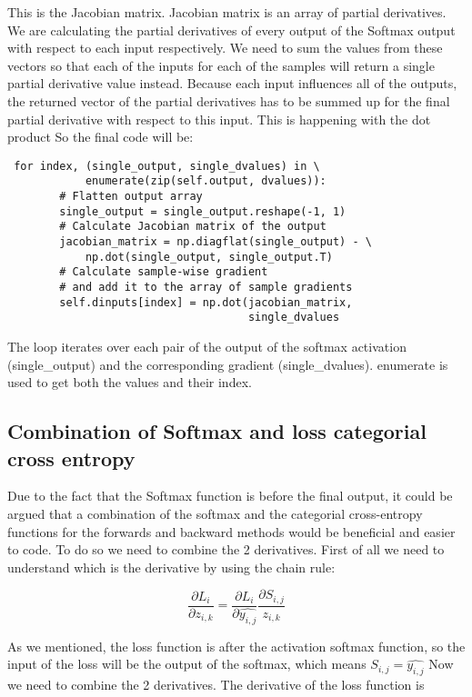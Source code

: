 \documentclass{article}
\begin{document}
This is the Jacobian matrix. Jacobian matrix is an array of partial derivatives. We are calculating the partial derivatives of every output of the Softmax output with respect to each input respectively. We need to sum the values from these vectors so that each of the inputs for each of the samples will return a single partial derivative value instead. Because each input influences all of the outputs, the returned vector of the partial derivatives has to be summed up for the final partial derivative with respect to this input. This is happening with the dot product
So the final code will be: 
\begin{lstlisting}
 for index, (single_output, single_dvalues) in \
            enumerate(zip(self.output, dvalues)):
        # Flatten output array
        single_output = single_output.reshape(-1, 1)
        # Calculate Jacobian matrix of the output
        jacobian_matrix = np.diagflat(single_output) - \
            np.dot(single_output, single_output.T)
        # Calculate sample-wise gradient
        # and add it to the array of sample gradients
        self.dinputs[index] = np.dot(jacobian_matrix,
                                     single_dvalues
\end{lstlisting}
The loop iterates over each pair of the output of the softmax activation (single\_output) and the corresponding gradient (single\_dvalues). enumerate is used to get both the values and their index.
\subsection{Combination of Softmax and loss categorial cross entropy}
Due to the fact that the Softmax function is before the final output, it could be argued that a combination of the softmax and the categorial cross-entropy functions for the forwards and backward methods would be beneficial and easier to code. To do so we need to combine the 2 derivatives.  
First of all we need to understand which is the derivative by using the chain rule: 

 \begin{equation}
     \frac{\partial L_i}{\partial z_{i,k}} = \frac{\partial L_i}{\partial \hat{y_{i,j}}} \frac{\partial S_{i,j}}{z_{i,k}} \end{equation}

As we mentioned, the loss function is after the activation softmax function, so the input of the loss will be the output of the softmax, which means $ S_{i , j} = \hat{y_{i,j}}$
Now we need to combine the 2 derivatives. 
The derivative of the loss function is 
\end{document}
